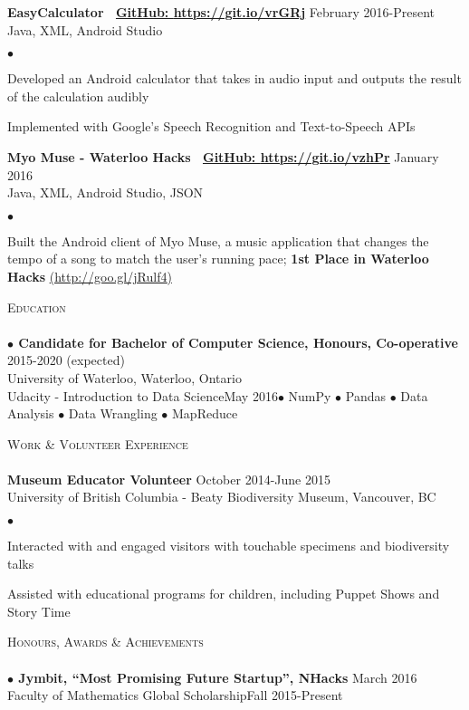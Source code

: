 \documentclass{article}
\newcommand{\lineunder}{\vspace*{-8pt} \\ \hspace*{-18pt} \hrulefill \\}
\newcommand{\header}[1]{{\hspace*{-15pt}\vspace*{6pt} \textsc{#1}} \vspace*{-6pt} \lineunder}
\newcommand{\employer}[3]{{ \textbf{#1} \hfill #2\\ {#3}\\  }}
\newenvironment{achievements}{\begin{list}{$\bullet$}{\topsep 0pt \itemsep -2pt}}{\vspace*{4pt}\end{list}}
\newcommand{\schoolwithcourses}[4]{
 \hspace{12pt} \textbf{$\bullet$ \hspace{2bp}#1} \hfill{#2}\\ \hspace{25pt}#3\\ 
\vspace*{5pt}
}
\newcommand{\award}[3]{\hspace{12pt} \textbf{$\bullet$ \hspace{2bp}#1} \hfill{#2} \\ \vspace{2pt}
}
\begin{document}
\employer{EasyCalculator \hspace{5pt} \Mundus~\href{https://git.io/vrGRj}{GitHub: \underline{https://git.io/vrGRj}}}{February 2016-Present}{Java, XML, Android Studio}
	\begin{achievements}
	\item Developed an Android calculator that takes in audio input and outputs the result of the calculation audibly
	\item Implemented with Google's Speech Recognition and Text-to-Speech APIs
	\end{achievements}

\employer{Myo Muse - Waterloo Hacks \hspace{5pt} \Mundus~\href{https://git.io/vzhPr}{GitHub: \underline{https://git.io/vzhPr}}}{January 2016}{Java, XML, Android Studio, JSON}
	\begin{achievements}
	\item Built the Android client of Myo Muse, a music application that changes the tempo of a song to match the user's running pace; \textbf{1st Place in Waterloo Hacks} \href{http://goo.gl/jRulf4}{(\underline{http://goo.gl/jRulf4})}
	\end{achievements}

\header{Education}

\schoolwithcourses{Candidate for Bachelor of Computer Science, Honours, Co-operative}{2015-2020 (expected)}{University of Waterloo, Waterloo, Ontario}

\schoolwithcourses{Udacity - Introduction to Data Science}{May 2016}{$\bullet$ NumPy $\bullet$ Pandas $\bullet$ Data Analysis $\bullet$ Data Wrangling $\bullet$ MapReduce}

\header{Work \& Volunteer Experience}
\employer{Museum Educator Volunteer}{October 2014-June 2015}{University of British Columbia - Beaty Biodiversity Museum, Vancouver, BC}
	\begin{achievements}
	\item Interacted with and engaged visitors with touchable specimens and biodiversity talks
	\item Assisted with educational programs for children, including Puppet Shows and Story Time 
	\end{achievements}

\header{Honours, Awards \& Achievements}

\award {Jymbit, ``Most Promising Future Startup'', NHacks}{March 2016}

\award {Faculty of Mathematics Global Scholarship}{Fall 2015-Present}
\end{document}
